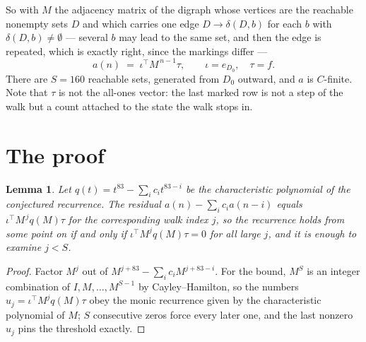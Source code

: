 \documentclass[11pt,a4paper]{article}
\theoremstyle{plain}
\newtheorem{lemma}[theorem]{Lemma}
\theoremstyle{definition}
\begin{document}
So with $M$ the adjacency matrix of the digraph whose vertices are the reachable nonempty sets
$D$ and which carries one edge $D\to\delta(D,b)$ for each $b$ with $\delta(D,b)\neq\emptyset$
--- several $b$ may lead to the same set, and then the edge is repeated, which is exactly
right, since the markings differ ---
\[
a(n)\;=\;\iota^{\!\top}M^{\,n-1}\tau,\qquad \iota=e_{D_0},\quad \tau=f .
\]
There are $S=160$ reachable sets, generated from $D_0$ outward, and $a$ is $C$-finite. Note
that $\tau$ is not the all-ones vector: the last marked row is not a step of the walk but a
count attached to the state the walk stops in.

\section{The proof}

\begin{lemma}\label{lem:crit}
Let $q(t)=t^{83}-\sum_i c_it^{83-i}$ be the characteristic polynomial of the
conjectured recurrence. The residual $a(n)-\sum_ic_ia(n-i)$ equals
$\iota^{\!\top}M^{\,j}q(M)\tau$ for the corresponding walk index $j$, so the recurrence
holds from some point on if and only if $\iota^{\!\top}M^{j}q(M)\tau=0$ for all large $j$,
and it is enough to examine $j<S$.
\end{lemma}

\begin{proof}
Factor $M^{j}$ out of $M^{j+83}-\sum_ic_iM^{j+83-i}$. For the bound, $M^{S}$
is an integer combination of $I,M,\dots,M^{S-1}$ by Cayley--Hamilton, so the numbers
$u_j=\iota^{\!\top}M^{j}q(M)\tau$ obey the monic recurrence given by the characteristic
polynomial of $M$; $S$ consecutive zeros force every later one, and the last nonzero $u_j$
pins the threshold exactly.
\end{proof}
\end{document}
